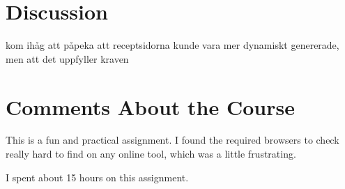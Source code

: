 \documentclass[a4paper]{scrreprt}
\begin{document}
\chapter{Discussion}

kom ihåg att påpeka att receptsidorna kunde vara mer dynamiskt genererade, men att det uppfyller kraven


\chapter{Comments About the Course}

This is a fun and practical assignment. I found the required browsers to check really hard to find on any online tool, which was a little frustrating.

I spent about 15 hours on this assignment.
\end{document}
